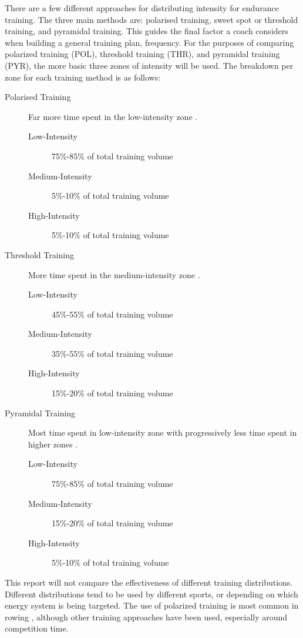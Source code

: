 There are a few different approaches for distributing intensity for endurance training. The three main methods are: polarised training, sweet spot or threshold training, and pyramidal training. This guides the final factor a coach considers when building a general training plan, frequency. For the purposes of comparing polarized training (POL), threshold training (THR), and pyramidal training (PYR), the more basic three zones of intensity will be used. The breakdown per zone for each training method is as follows:
\begin{description}
  \item[Polarised Training] Far more time spent in the low-intensity zone \autocite{Seiler2004}.

  \begin{description}
    \item[Low-Intensity] 75\%-85\% of total training volume
    \item[Medium-Intensity] 5\%-10\% of total training volume
    \item[High-Intensity] 5\%-10\% of total training volume  
  \end{description} 
  \item[Threshold Training] More time spent in the medium-intensity zone \autocite{Seiler2004}.

  \begin{description}
    \item[Low-Intensity] 45\%-55\% of total training volume
    \item[Medium-Intensity] 35\%-55\% of total training volume
    \item[High-Intensity] 15\%-20\% of total training volume  
  \end{description}
  \item[Pyramidal Training] Most time spent in low-intensity zone with progressively less time spent in higher zones \autocite{Selles2019}.

  \begin{description}
    \item[Low-Intensity] 75\%-85\% of total training volume
    \item[Medium-Intensity] 15\%-20\% of total training volume
    \item[High-Intensity] 5\%-10\% of total training volume  
  \end{description}
\end{description}

This report will not compare the effectiveness of different training distributions. Different distributions tend to be used by different sports, or depending on which energy system is being targeted. The use of polarized training is most common in rowing \autocite{Rosenblat2019}, although other training approaches have been used, especially around competition time.


